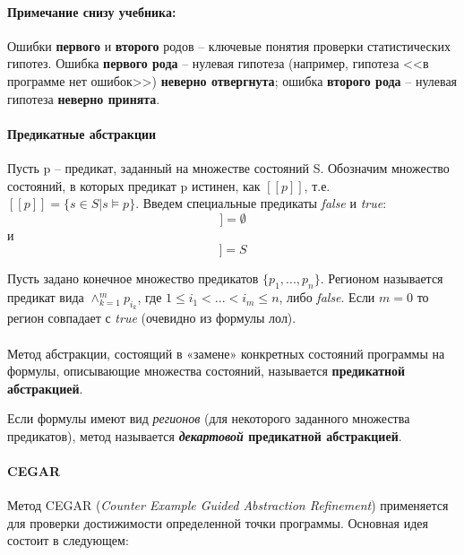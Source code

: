 \paragraph{Примечание снизу учебника:}
Ошибки \textbf{первого} и \textbf{второго} родов -- ключевые понятия проверки статистических гипотез. 
Ошибка \textbf{первого рода} -- нулевая гипотеза (например, гипотеза <<в программе нет ошибок>>) \textbf{неверно отвергнута}; ошибка \textbf{второго рода} -- нулевая гипотеза \textbf{неверно принята}.

\paragraph{Предикатные абстракции}

Пусть p -- предикат, заданный на множестве состояний S. Обозначим множество состояний, в которых предикат p истинен, как $[[p]]$, т.е. $[[p]] = \{s \in S | s \models p\}$.
Введем специальные предикаты \textit{false} и \textit{true}:
\begin{displaymath}
	[[false]] = \emptyset 
\end{displaymath}
и 
\begin{displaymath}
	[[true]] = S
\end{displaymath}

Пусть задано конечное множество предикатов $\{p_1, ..., p_n\}$.
Регионом называется предикат вида $\wedge^{m}_{k=1} p_{i_k}$, где $1 \leq i_1 < ... < i_m \leq n$, либо \textit{false}.
Если $m = 0$ то регион совпадает с \textit{true} (очевидно из формулы лол).

\paragraph{}
Метод абстракции, состоящий в «замене» конкретных состояний программы на формулы, описывающие множества состояний, называется \textbf{предикатной абстракцией}. 

Если формулы имеют вид \textit{регионов} (для некоторого заданного множества предикатов), метод называется \textbf{\textit{декартовой} предикатной абстракцией}.

\paragraph{CEGAR}

Метод CEGAR (\textit{Counter Example Guided Abstraction Refinement}) применяется для проверки достижимости определенной точки программы. Основная идея состоит в следующем:


